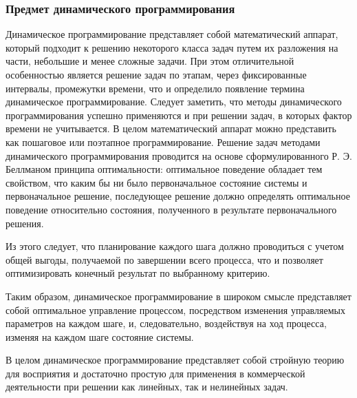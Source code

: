 \subsubsection{Предмет динамического программирования}

Динамическое программирование представляет собой математический аппарат, который подходит к решению некоторого класса задач путем их разложения на части, небольшие и менее сложные задачи. При этом отличительной особенностью является решение задач по этапам, через фиксированные интервалы, промежутки времени, что и определило появление термина динамическое программирование. Следует заметить, что методы динамического программирования успешно применяются и при решении задач, в которых фактор времени не учитывается. В целом математический аппарат можно представить как пошаговое или поэтапное программирование. Решение задач методами динамического программирования проводится на основе сформулированного Р. Э. Беллманом принципа оптимальности: оптимальное поведение обладает тем свойством, что каким бы ни было первоначальное состояние системы и первоначальное решение, последующее решение должно определять оптимальное поведение относительно состояния, полученного в результате первоначального решения.

Из этого следует, что планирование каждого шага должно проводиться с учетом общей выгоды, получаемой по завершении всего процесса, что и позволяет оптимизировать конечный результат по выбранному критерию.

Таким образом, динамическое программирование в широком смысле представляет собой оптимальное управление процессом, посредством изменения управляемых параметров на каждом шаге, и, следовательно, воздействуя на ход процесса, изменяя на каждом шаге состояние системы.

В целом динамическое программирование представляет собой стройную теорию для восприятия и достаточно простую для применения в коммерческой деятельности при решении как линейных, так и нелинейных задач.


